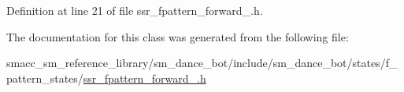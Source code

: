 Definition at line 21 of file ssr\+\_\+fpattern\+\_\+forward\+\_.\+h.




The documentation for this class was generated from the following file\+:\begin{DoxyCompactItemize}
\item 
smacc\+\_\+sm\+\_\+reference\+\_\+library/sm\+\_\+dance\+\_\+bot/include/sm\+\_\+dance\+\_\+bot/states/f\+\_\+pattern\+\_\+states/\hyperlink{ssr__fpattern__forward__1_8h}{ssr\+\_\+fpattern\+\_\+forward\+\_.\+h}\end{DoxyCompactItemize}
